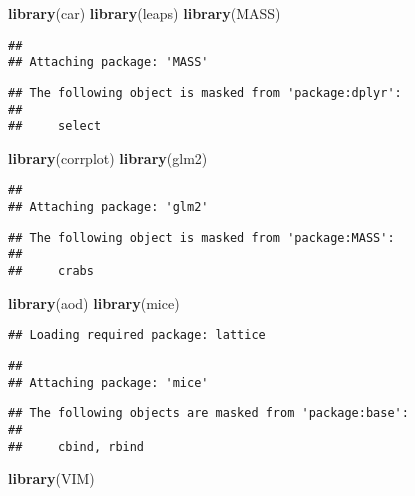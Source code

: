 \documentclass[]{article}
\newenvironment{Shaded}{\begin{snugshade}}{\end{snugshade}}
\newcommand{\KeywordTok}[1]{\textcolor[rgb]{0.13,0.29,0.53}{\textbf{#1}}}
\newcommand{\NormalTok}[1]{#1}
\begin{document}
\begin{Shaded}
\begin{Highlighting}[]
\KeywordTok{library}\NormalTok{(car)}
\KeywordTok{library}\NormalTok{(leaps)}
\KeywordTok{library}\NormalTok{(MASS)}
\end{Highlighting}
\end{Shaded}

\begin{verbatim}
## 
## Attaching package: 'MASS'
\end{verbatim}

\begin{verbatim}
## The following object is masked from 'package:dplyr':
## 
##     select
\end{verbatim}

\begin{Shaded}
\begin{Highlighting}[]
\KeywordTok{library}\NormalTok{(corrplot)}
\KeywordTok{library}\NormalTok{(glm2)}
\end{Highlighting}
\end{Shaded}

\begin{verbatim}
## 
## Attaching package: 'glm2'
\end{verbatim}

\begin{verbatim}
## The following object is masked from 'package:MASS':
## 
##     crabs
\end{verbatim}

\begin{Shaded}
\begin{Highlighting}[]
\KeywordTok{library}\NormalTok{(aod)}
\KeywordTok{library}\NormalTok{(mice)}
\end{Highlighting}
\end{Shaded}

\begin{verbatim}
## Loading required package: lattice
\end{verbatim}

\begin{verbatim}
## 
## Attaching package: 'mice'
\end{verbatim}

\begin{verbatim}
## The following objects are masked from 'package:base':
## 
##     cbind, rbind
\end{verbatim}

\begin{Shaded}
\begin{Highlighting}[]
\KeywordTok{library}\NormalTok{(VIM)}
\end{Highlighting}
\end{Shaded}
\end{document}
